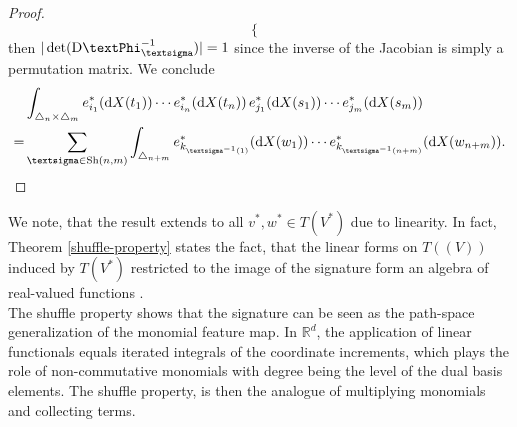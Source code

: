 \documentclass[openany]{book}
\begin{document}
\begin{theorem}
\begin{proof}
\begin{equation*}
\begin{cases}
        \end{cases}
    \end{equation*}
    then $\vert \det(\mathrm D\gPhi_{\gsigma}^{-1})\vert =1$ since the inverse of the Jacobian is simply a permutation matrix.
    We conclude
    \begin{equation*}
        \begin{split}
            &\int_{\triangle_n\times \triangle_{m}} e_{i_1}^\ast(\mathrm dX(t_1))\cdots e_{i_n}^\ast(\mathrm dX(t_n))\, e_{j_1}^\ast(\mathrm dX(s_1))\cdots e_{j_m}^\ast(\mathrm dX(s_m))\\=&\sum_{\gsigma\in \mathrm{Sh}(n,m)}\int_{\triangle_{n+m}}e^\ast_{k_{\gsigma^{-1}(1)}}(\mathrm dX(w_1))\cdots e^\ast_{k_{\gsigma^{-1}(n+m)}}(\mathrm dX(w_{n+m})).\qedhere
        \end{split}
    \end{equation*}
    \end{proof}
\end{theorem}
We note, that the result extends to all $v^\ast, w^\ast\in T(V^\ast)$ due to linearity. In fact, Theorem \ref{shuffle-property} states the fact, that the linear forms on $T((V))$ induced by $T(V^\ast)$ restricted to the image of the signature form an algebra of real-valued functions \cite{lyons2007}.
\\ The shuffle property shows that the signature can be seen as the path-space generalization of the monomial feature map. In $\mathbb R^d$, the application of linear functionals equals iterated integrals of the coordinate increments, which plays the role of non-commutative monomials with degree being the level of the dual basis elements. The shuffle property, is then the analogue of multiplying monomials and collecting terms. 
\end{document}
